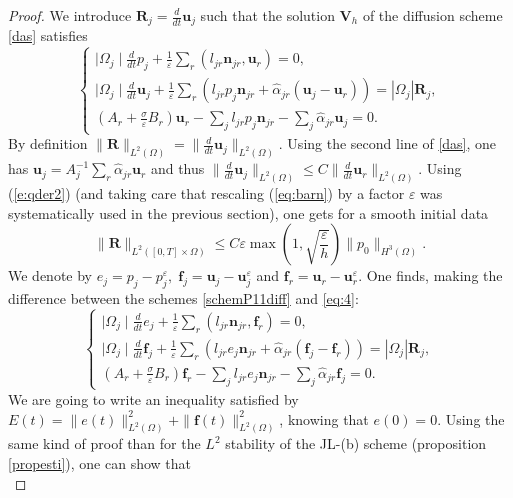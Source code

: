\documentclass[a4paper,french,english,10pt]{article}
\newcommand\ljr{l_{jr}}
\newcommand\njr{\mathbf{n}_{jr}}
\newcommand\uu{\mathbf{u}}
\newcommand\si{\sigma}
\newcommand\eps{\varepsilon}
\newcommand{\ds}{\displaystyle}
\newcommand\alj{\widehat{\alpha}_{jr}}
\newcommand\uj{\uu_j}
\newcommand\ur{\uu_r}
\newcommand\fj{\mathbf{f}_j}
\newcommand\fr{\mathbf{f}_r}
\newcommand\V{\mathbf{V}}
\begin{document}
\begin{proof}
We introduce $\mathbf{R}_j= \frac{d}{dt} \mathbf u_j$  such that the solution $\V_h$ of the
diffusion scheme \eqref{das} satisfies
\begin{equation}\label{schemP11diff}
\left\{\begin{array}{l}
\ds \mid \Omega_j \mid\frac{d}{dt} p_j+\frac{1}{\eps}\sum_r(\ljr\njr,\ur)=0,\\
\ds \mid \Omega_j \mid\frac{d}{dt}\uj+\frac{1}{\eps}\sum_r(\ljr p_j\njr
+\alj(\uj-\ur)) =|\Omega_j| \mathbf{R}_j,\\
\ds \left(A_r+\frac{\si}{\eps}B_r\right) \ur-\sum_j\ljr
p_j\njr-\sum_j\alj  \uj=0 .
\end{array}\right.
\end{equation}
By definition $\|\mathbf{R}\|_{L^2(\Omega)}= \|\frac{d}{dt}
\uj\|_{L^2(\Omega)}$. Using the second line of \eqref{das}, one has
$\uj=A_j^{-1}\sum_r \alj\ur$ and thus $\|\frac{d}{dt}
\uj\|_{L^2(\Omega)}\leq C \|\frac{d}{dt} \ur\|_{L^2(\Omega)}$. 
Using
(\ref{e:qder2}) (and taking care
that  rescaling (\ref{eq:barn}) by a factor $\eps$
was systematically used
in the previous section), one gets
for a smooth initial data
\begin{equation*}\label{dddd}
\|\mathbf{R}\|_{L^2([0,T]\times\Omega)}\leq C
\eps \max\left(1, \sqrt{\frac\eps h}   \right) \|  p_0  \|_{H^3(\Omega)}.
\end{equation*}
We denote by $e_j=p_j-p_j^{\eps}, \;
\fj =\uj-\uj^{\eps}$ and
$\fr =\ur-\ur^{\eps}$. One finds, making the
difference between the schemes \eqref{schemP11diff} and \eqref{eq:4}:
\begin{equation*}\label{schemP11diff2}
\left\{\begin{array}{l}
\ds \mid \Omega_j \mid\frac{d}{dt} e_j+\frac{1}{\eps}\sum_r(\ljr\njr,\fr )=0,\\
\ds \mid \Omega_j \mid\frac{d}{dt} \fj +\frac{1}{\eps}\sum_r(\ljr e_j\njr
+\alj(\fj -\fr )) =|\Omega_j| \mathbf{R}_j,\\
\ds \left(A_r+\frac{\si}{\eps}B_r\right) \fr -\sum_j\ljr
e_j\njr-\sum_j\alj  \fj =0.
\end{array}\right.
\end{equation*}
 We are going to write an inequality satisfied  by $E(t)=
\| e(t)\|_{L^2(\Omega)  } ^2+\|\mathbf f(t)\|_{L^2(\Omega)  }^2
$, knowing that  $e(0)=0  $. Using the
same kind of proof than for the $L^2$ stability of the JL-(b) scheme
(proposition \ref{propesti}), one can show that
 \begin{equation*}

\end{equation*}
\end{proof}
\end{document}
